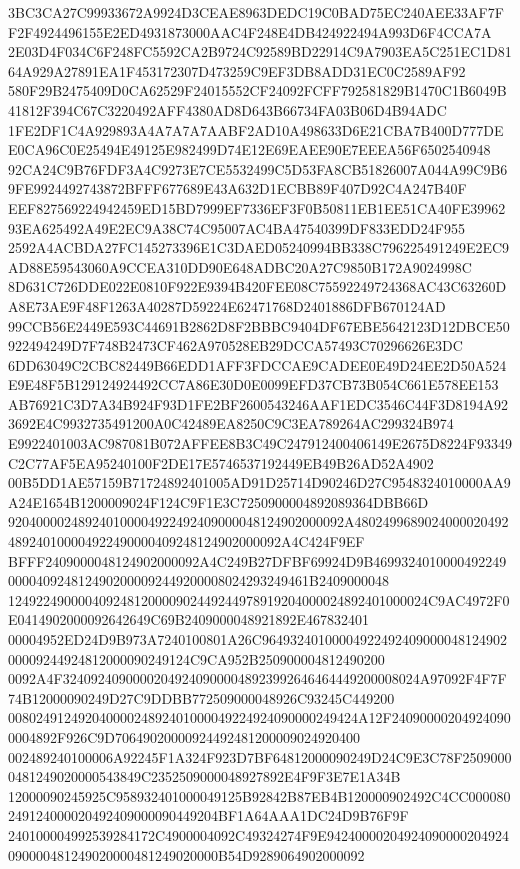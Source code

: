 \documentclass[UTF8,fontset=fandol,zihao=-4,a4paper]{ctexart}
\begin{document}
{{3BC3CA27C99933672A9924D3CEAE8963DEDC19C0BAD75EC240AEE33AF7FF2F4924496155E2ED4931873000AAC4F248E4DB424922494A993D6F4CCA7A
2E03D4F034C6F248FC5592CA2B9724C92589BD22914C9A7903EA5C251EC1D8164A929A27891EA1F453172307D473259C9EF3DB8ADD31EC0C2589AF92
580F29B2475409D0CA62529F24015552CF24092FCFF792581829B1470C1B6049B41812F394C67C3220492AFF4380AD8D643B66734FA03B06D4B94ADC
1FE2DF1C4A929893A4A7A7A7AABF2AD10A498633D6E21CBA7B400D777DEE0CA96C0E25494E49125E982499D74E12E69EAEE90E7EEEA56F6502540948
92CA24C9B76FDF3A4C9273E7CE5532499C5D53FA8CB51826007A044A99C9B69FE9924492743872BFFF677689E43A632D1ECBB89F407D92C4A247B40F
EEF827569224942459ED15BD7999EF7336EF3F0B50811EB1EE51CA40FE3996293EA625492A49E2EC9A38C74C95007AC4BA47540399DF833EDD24F955
2592A4ACBDA27FC145273396E1C3DAED05240994BB338C796225491249E2EC9AD88E59543060A9CCEA310DD90E648ADBC20A27C9850B172A9024998C
8D631C726DDE022E0810F922E9394B420FEE08C75592249724368AC43C63260DA8E73AE9F48F1263A40287D59224E62471768D2401886DFB670124AD
99CCB56E2449E593C44691B2862D8F2BBBC9404DF67EBE5642123D12DBCE50922494249D7F748B2473CF462A970528EB29DCCA57493C70296626E3DC
6DD63049C2CBC82449B66EDD1AFF3FDCCAE9CADEE0E49D24EE2D50A524E9E48F5B129124924492CC7A86E30D0E0099EFD37CB73B054C661E578EE153
AB76921C3D7A34B924F93D1FE2BF2600543246AAF1EDC3546C44F3D8194A923692E4C9932735491200A0C42489EA8250C9C3EA789264AC299324B974
E9922401003AC987081B072AFFEE8B3C49C247912400406149E2675D8224F93349C2C77AF5EA95240100F2DE17E5746537192449EB49B26AD52A4902
00B5DD1AE57159B71724892401005AD91D25714D90246D27C9548324010000AA9A24E1654B1200009024F124C9F1E3C7250900004892089364DBB66D
920400002489240100004922492409000048124902000092A4802499689024000020492489240100004922490000409248124902000092A4C424F9EF
BFFF2409000048124902000092A4C249B27DFBF69924D9B46993240100004922490000409248124902000092449200008024293249461B2409000048
124922490000409248120000902449244978919204000024892401000024C9AC4972F0E0414902000092642649C69B2409000048921892E467832401
00004952ED24D9B973A7240100801A26C9649324010000492249240900004812490200009244924812000090249124C9CA952B250900004812490200
0092A4F324092409000020492409000048923992646464449200008024A97092F4F7F74B12000090249D27C9DDBB772509000048926C93245C449200
00802491249204000024892401000049224924090000249424A12F240900002049240900004892F926C9D70649020000924492481200009024920400
002489240100006A92245F1A324F923D7BF64812000090249D24C9E3C78F25090000481249020000543849C2352509000048927892E4F9F3E7E1A34B
12000090245925C958932401000049125B92842B87EB4B120000902492C4CC000080249124000020492409000090449204BF1A64AAA1DC24D9B76F9F
240100004992539284172C4900004092C49324274F9E94240000204924090000204924090000481249020000481249020000B54D9289064902000092
}}
\end{document}
